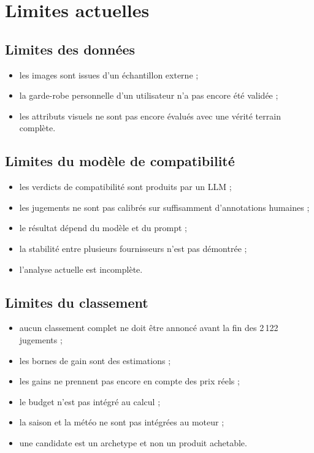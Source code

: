 \documentclass[11pt,a4paper]{article}
\begin{document}
\section{Limites actuelles}

\subsection{Limites des données}

\begin{itemize}[leftmargin=*]
    \item les images sont issues d'un échantillon externe ;
    \item la garde-robe personnelle d'un utilisateur n'a pas encore été validée ;
    \item les attributs visuels ne sont pas encore évalués avec une vérité
    terrain complète.
\end{itemize}

\subsection{Limites du modèle de compatibilité}

\begin{itemize}[leftmargin=*]
    \item les verdicts de compatibilité sont produits par un LLM ;
    \item les jugements ne sont pas calibrés sur suffisamment d'annotations
    humaines ;
    \item le résultat dépend du modèle et du prompt ;
    \item la stabilité entre plusieurs fournisseurs n'est pas démontrée ;
    \item l'analyse actuelle est incomplète.
\end{itemize}

\subsection{Limites du classement}

\begin{itemize}[leftmargin=*]
    \item aucun classement complet ne doit être annoncé avant la fin des
    2\,122 jugements ;
    \item les bornes de gain sont des estimations ;
    \item les gains ne prennent pas encore en compte des prix réels ;
    \item le budget n'est pas intégré au calcul ;
    \item la saison et la météo ne sont pas intégrées au moteur ;
    \item une candidate est un archetype et non un produit achetable.
\end{itemize}
\end{document}
